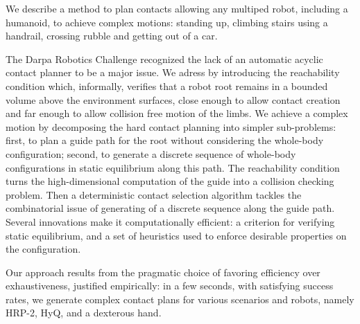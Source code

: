 We describe  a method to plan contacts allowing any multiped robot, including a humanoid, to achieve complex motions: standing up, climbing stairs using a handrail, crossing rubble and getting out of a car. 

The Darpa Robotics Challenge recognized the lack  of an automatic acyclic contact planner to be a major issue. We adress by introducing the reachability condition which, informally, verifies that a robot root remains in a bounded volume above the environment surfaces, close enough to allow contact creation and far enough to allow collision free motion of the limbs.  We achieve a complex motion by decomposing the hard contact planning into simpler sub-problems: first, to plan a guide path for the root without considering the whole-body configuration; second, to generate a discrete sequence of whole-body configurations in static equilibrium along this path. The reachability condition turns the high-dimensional computation of the guide into a collision checking problem. Then a deterministic contact selection algorithm tackles the combinatorial issue of  generating of a discrete sequence along the guide path. Several innovations make it computationally efficient: a criterion for verifying static equilibrium, and a set of heuristics used to enforce desirable properties on the configuration.

Our approach results from the pragmatic choice of favoring efficiency over exhaustiveness, justified empirically: in a few seconds, with satisfying success rates, we generate complex contact plans for various scenarios and robots, namely HRP-2, HyQ, and a dexterous hand.
